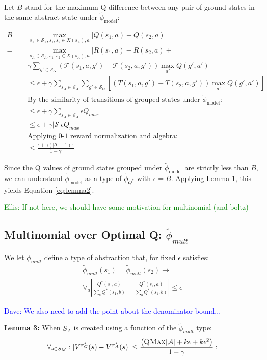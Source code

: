 \documentclass{article}
\newcommand{\ep}{\widetilde \phi}
\newcommand{\epQ}{\ep_{Q^*}}
\newcommand{\epM}{\ep_{\text{model}}}
\newcommand{\mcS}{\mathcal{S}}
\newcommand{\mcT}{\mathcal{T}}
\newcommand\dnote[1]{\textcolor{blue}{Dave: #1}}
\newcommand\enote[1]{\textcolor{green}{Ellis: #1}}
\begin{document}
Let $B$ stand for the maximum Q difference between any pair of ground states in the same abstract state under $\epM$:

\begin{align*}
B = &\max_{s_A \in \mcS_A, s_1, s_2 \in X(s_A), a} |Q(s_1, a) - Q(s_2, a)|\\
=&\max_{s_A \in \mcS_A, s_1, s_2 \in X(s_A), a}      |R(s_1, a) - R(s_2, a) +\\
& \gamma \sum_{g' \in \mcS_G}(\mcT(s_1,a,g')-\mcT(s_2, a, g'))\max_{a'}Q(g', a')|\\
&\leq \epsilon + \gamma \sum_{s_A \in \mcS_A}\sum_{g' \in \mcS_G}\left[(T(s_1, a, g')-T(s_2, a, g')) 		\max_{a'}Q(g', a')	\right]\\
&\text{By the similarity of transitions of grouped states under $\epM$:}\\
& \leq \epsilon + \gamma \sum_{s_A \in \mcS_A} \epsilon Q_{max} \\
&\leq \epsilon + \gamma|\mcS|\epsilon Q_{max}\\
&\text{Applying 0-1 reward normalization and algebra:}\\
& \leq \frac{\epsilon + \gamma(|\mcS| - 1) \epsilon}{1-\gamma}
\end{align*}

Since the Q values of ground states grouped under $\epM$ are strictly less than $B$, we can understand $\epM$ as a type of $\epQ$ with $\epsilon = B$. Applying Lemma 1, this yields Equation \ref{eq:lemma2}.






\enote{If not here, we should have some motivation for multinomial (and boltz)}
\subsection{Multinomial over Optimal Q: $\ep_{mult}$}

We let $\phi_{mult}$ define a type of abstraction that, for fixed $\epsilon$ satisfies:
\begin{multline}
\ep_{mult}(s_1) = \ep_{mult}(s_2) \rightarrow \\
\forall_{a} \left|\frac{Q^*(s_1,a)}{\sum_b Q^*(s_1,b)} - \frac{Q^*(s_1,a)}{\sum_b Q^*(s_1,b)}\right| \leq \epsilon
\end{multline}

\dnote{We also need to add the point about the denominator bound...}

{\bf Lemma 3:} When $S_A$ is created using a function of the $\ep_{mult}$ type:
\begin{equation}
\forall_{s \in S_M} : | V^{\pi^*_G}(s) - V^{\pi^*_{A}}(s) | \leq \frac{\left(\textsc{QMax}|\mathcal{A}| + k \epsilon + k \epsilon^2\right)}{1-\gamma}:
\end{equation}
\end{document}
